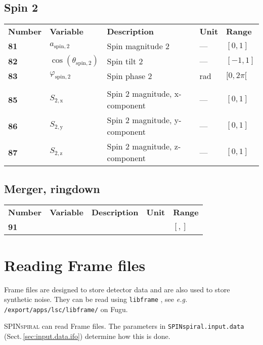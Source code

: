 \subsection{Spin 2}
\begin{tabular}{lllll}
  \textbf{Number} & \textbf{Variable} & \textbf{Description} & \textbf{Unit} & \textbf{Range} \\
  \textbf{81} & $a_\mathrm{spin,2}$  & Spin magnitude 2 & --- & $[0,1]$ \\
  \textbf{82} & $\cos(\theta_\mathrm{spin,2})$  & Spin tilt 2 & --- & $[-1,1]$ \\
  \textbf{83} & $\varphi_\mathrm{spin,2}$  & Spin phase 2 & rad & $[0,2\pi[$ \\
      & & & & \\
  \textbf{85} & $S_\mathrm{2,x}$  & Spin 2 magnitude, x-component & --- & $[0,1]$ \\
  \textbf{86} & $S_\mathrm{2,y}$  & Spin 2 magnitude, y-component & --- & $[0,1]$ \\
  \textbf{87} & $S_\mathrm{2,z}$  & Spin 2 magnitude, z-component & --- & $[0,1]$ \\
\end{tabular}

\subsection{Merger, ringdown}
\begin{tabular}{lllll}
  \textbf{Number} & \textbf{Variable} & \textbf{Description} & \textbf{Unit} & \textbf{Range} \\
  \textbf{91} &   & & & $[,]$ \\
\end{tabular}








\pagebreak
\section{Reading Frame files}
\label{sec:frame}

Frame files are designed to store detector data and are also used to store synthetic noise.
They can be read using \texttt{libframe} \cite{FrameLibrary}, see \textit{e.g.}
\texttt{/export/apps/lsc/libframe/} on Fugu.  

\textsc{SPINspiral} can read Frame files.  The parameters in \texttt{SPINspiral.input.data}
(Sect.\,\ref{sec:input.data.ifo}) determine how this is done.

